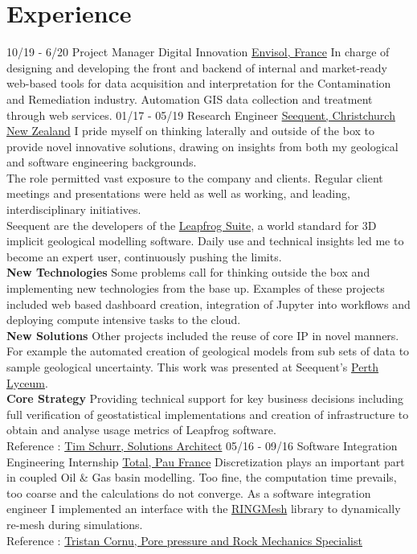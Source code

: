 \documentclass[]{friggeri-cv}
\begin{document}
\section{Experience}
\begin{entrylist}
  \entry
  {10/19 - 6/20}
  {Project Manager Digital Innovation}
  {\href{http://envisol.net/}{Envisol, France}}
  {In charge of designing and developing the front and backend of internal and market-ready web-based tools for data acquisition and interpretation for the Contamination and Remediation industry. Automation GIS data collection and treatment through web services.}
  \entry
    {01/17 - 05/19}
    {Research Engineer}
    {\href{https://www.seequent.com/}{Seequent, Christchurch New Zealand}}
    {I pride myself on thinking laterally and outside of the box to provide novel innovative solutions, drawing on insights from both my geological and software engineering backgrounds.
    \\[3pt]
    The role permitted vast exposure to the company and clients. Regular client meetings and presentations were held as well as working, and leading, interdisciplinary initiatives.
    \\[3pt]
    Seequent are the developers of the \href{https://www.leapfrog3d.com/}{Leapfrog Suite}, a world standard for 3D implicit geological modelling software. Daily use and technical insights led me to become an expert user, continuously pushing the limits.
    \\[6pt]
   	\textbf{New Technologies} Some problems call for thinking outside the box and implementing new technologies from the base up. Examples of these projects included web based dashboard creation, integration of Jupyter into workflows and deploying compute intensive tasks to the cloud.
   	\\[6pt]
   	\textbf{New Solutions} Other projects included the reuse of core IP in novel manners. For example the automated creation of geological models from sub sets of data to sample geological uncertainty. This work was presented at Seequent's \href{https://www.youtube.com/watch?v=jt26J5ljlA0}{Perth Lyceum}.
    \\[6pt]
   	\textbf{Core Strategy} Providing technical support for key business decisions including full verification of geostatistical implementations and creation of infrastructure to obtain and analyse usage metrics of Leapfrog software. 
    \\
    Reference : \href{mailto:tim.schurr@seequent.com}{Tim Schurr, Solutions Architect}
	}
  \entry
    {05/16 - 09/16}
    {Software Integration Engineering Internship}
    {\href{https://www.total.com/en}{Total, Pau France}}
    {Discretization plays an important part in coupled Oil \& Gas basin modelling. Too fine, the computation time prevails, too coarse and the calculations do not converge. As a software integration engineer I implemented an interface with the \href{http://www.ring-team.org/software/ringmesh}{RINGMesh} library to dynamically re-mesh during simulations.\\ Reference : \href{mailto:tristan.cornu@total.com}{Tristan Cornu, Pore pressure and Rock Mechanics Specialist}}
    \end{entrylist}
    
\end{document}

